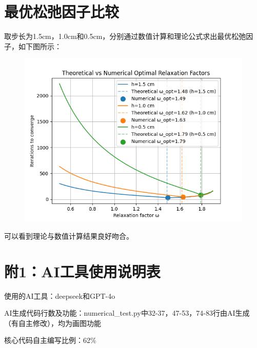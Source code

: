 \documentclass[12pt, a4paper]{article}
\begin{document}
\section{最优松弛因子比较}
取步长为1.5cm，1.0cm和0.5cm，分别通过数值计算和理论公式求出最优松弛因子，如下图所示：
\begin{figure}
    \centering
    \includegraphics[width=\textwidth]{pictures/Theoretical vs Numerical Optimal Relaxation Factors.png}
\end{figure}
可以看到理论与数值计算结果良好吻合。

\section*{附1：AI工具使用说明表}
使用的AI工具：deepseek和GPT-4o

AI生成代码行数及功能：numerical\_test.py中32-37，47-53，74-83行由AI生成（有自主修改），均为画图功能

核心代码自主编写比例：62\%
\end{document}
